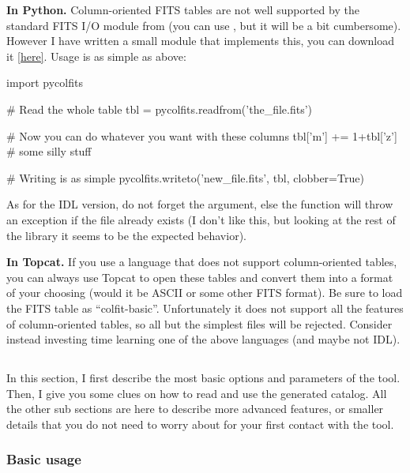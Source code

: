 \documentclass[12pt,a4paper]{article}
\begin{document}
{\bf In Python.} Column-oriented FITS tables are not well supported by the standard FITS I/O module from  (you can use , but it will be a bit cumbersome). However I have written a small module that implements this, you can download it \href{https://github.com/cschreib/phypp/blob/master/python/pycolfits.py}{[here]}. Usage is as simple as above:
\begin{pythoncode}
import pycolfits

# Read the whole table
tbl = pycolfits.readfrom('the_file.fits')

# Now you can do whatever you want with these columns
tbl['m'] += 1+tbl['z'] # some silly stuff

# Writing is as simple
pycolfits.writeto('new_file.fits', tbl, clobber=True)
\end{pythoncode}
As for the IDL version, do not forget the  argument, else the function will throw an exception if the file already exists (I don't like this, but looking at the rest of the  library it seems to be the expected behavior).

{\bf In Topcat.} If you use a language that does not support column-oriented tables, you can always use Topcat to open these tables and convert them into a format of your choosing (would it be ASCII or some other FITS format). Be sure to load the FITS table as ``colfit-basic''. Unfortunately it does not support all the features of column-oriented tables, so all but the simplest files will be rejected. Consider instead investing time learning one of the above languages (and maybe not IDL).


\subsection{}

In this section, I first describe the most basic options and parameters of the tool. Then, I give you some clues on how to read and use the generated catalog. All the other sub sections are here to describe more advanced features, or smaller details that you do not need to worry about for your first contact with the tool.

\subsubsection{Basic usage}
\end{document}
